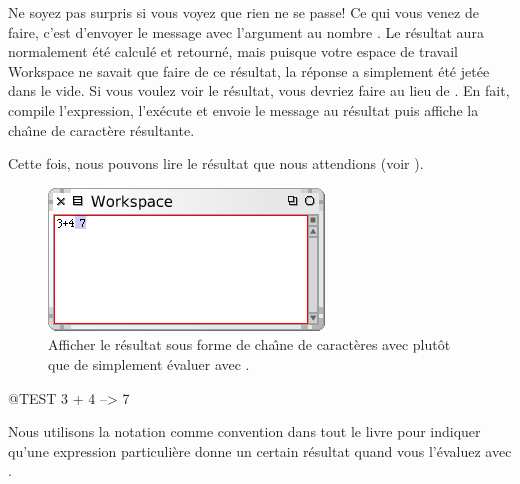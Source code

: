 \documentclass[a4paper,10pt,twoside]{book}
\begin{document}

Ne soyez pas surpris si vous voyez que rien ne se passe!
Ce qui vous venez de faire, c'est d'envoyer le message \ct{+} avec
l'argument  au nombre . Le r\'esultat  aura
normalement \'et\'e calcul\'e et retourn\'e, mais puisque votre espace de
travail Workspace ne savait que faire de ce r\'esultat, la r\'eponse a
simplement \'et\'e jet\'ee dans le vide. Si vous voulez voir le
r\'esultat, vous devriez faire  au lieu
de . En fait,  compile l'expression,
l'ex\'ecute et envoie le message  au r\'esultat puis
affiche la cha\^{\i}ne de caract\`ere r\'esultante.

Cette fois, nous pouvons lire le r\'esultat que nous attendions (voir
).

\begin{figure}[htb]
\centerline {\includegraphics[scale=0.7]{PrintIt}}
\caption{Afficher le r\'esultat sous forme de cha\^{\i}ne de
  caract\`eres avec  plut\^ot que de simplement
  \'evaluer avec . \label{fig:printit}}
\end{figure}

\begin{code}{@TEST}
3 + 4 --> 7
\end{code}
\noindent
Nous utilisons la notation \ct{-->} comme convention dans tout le
livre pour indiquer qu'une expression particuli\`ere donne un certain
r\'esultat quand vous l'\'evaluez avec .

\end{document}
